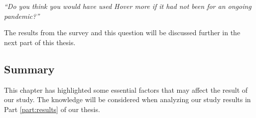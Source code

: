 \textit{“Do you think you would have used Hover more if it had not been for an ongoing pandemic?”}

The results from the survey and this question will be discussed further in the next part of this thesis.

\subsection{Summary}
This chapter has highlighted some essential factors that may affect the result of our study. The knowledge will be considered when analyzing our study results in Part \ref{part:results} of our thesis.